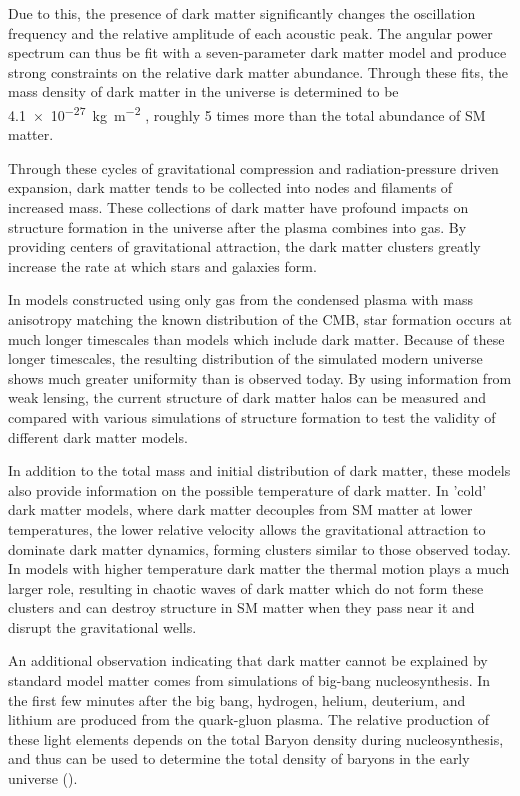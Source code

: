 Due to this, the presence of dark matter significantly changes the oscillation frequency and the relative amplitude of each acoustic peak.
The angular power spectrum can thus be fit with a seven-parameter dark matter model and produce strong constraints on the relative dark matter abundance.
Through these fits, the mass density of dark matter in the universe is determined to be \SI{4.1e-27}{\kilo\gram\per\meter\squared} \cite{PlanckCMB}, roughly 5 times more than the total abundance of SM matter.

Through these cycles of gravitational compression and radiation-pressure driven expansion, dark matter tends to be collected into nodes and filaments of increased mass. 
These collections of dark matter have profound impacts on structure formation in the universe after the plasma combines into gas.
By providing centers of gravitational attraction, the dark matter clusters greatly increase the rate at which stars and galaxies form.

In models constructed using only gas from the condensed plasma with mass anisotropy matching the known distribution of the CMB, star formation occurs at much longer timescales than models which include dark matter.
Because of these longer timescales, the resulting distribution of the simulated modern universe shows much greater uniformity than is observed today. 
By using information from weak lensing, the current structure of dark matter halos can be measured and compared with various simulations of structure formation to test the validity of different dark matter models.

In addition to the total mass and initial distribution of dark matter, these models also provide information on the possible temperature of dark matter.
In 'cold' dark matter models, where dark matter decouples from SM matter at lower temperatures, the lower relative velocity allows the gravitational attraction to dominate dark matter dynamics, forming clusters similar to those observed today.
In models with higher temperature dark matter the thermal motion plays a much larger role, resulting in chaotic waves of dark matter which do not form these clusters and can destroy structure in SM matter when they pass near it and disrupt the gravitational wells.

An additional observation indicating that dark matter cannot be explained by standard model matter comes from simulations of big-bang nucleosynthesis. 
In the first few minutes after the big bang, hydrogen, helium, deuterium, and lithium are produced from the quark-gluon plasma. 
The relative production of these light elements depends on the total Baryon density during nucleosynthesis, and thus can be used to determine the total density of baryons in the early universe ().

